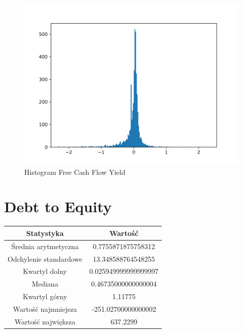 \documentclass{article}
\begin{document}
\begin{figure}[h!]
    \includegraphics[width=\linewidth]{variables/Free Cash Flow Yield.png}
    \caption{Histogram Free Cash Flow Yield }
\end{figure}\section{ Debt to Equity }

\begin{center}
    \begin{tabular}{|c | c|} 
    \hline
    Statystyka & Wartość \\
    \hline\hline
    Średnia arytmetyczna & 0.7755871875758312 \\ 
    \hline
    Odchylenie standardowe & 13.348588764548255 \\
    \hline
    Kwartyl dolny & 0.025949999999999997 \\
    \hline
    Mediana & 0.46735000000000004 \\
    \hline
    Kwartyl górny & 1.11775 \\
    \hline
    Wartość najmniejsza & -251.02700000000002 \\
    \hline
    Wartość największa & 637.2299 \\
    \hline
   \end{tabular}
\end{center}
\end{document}

